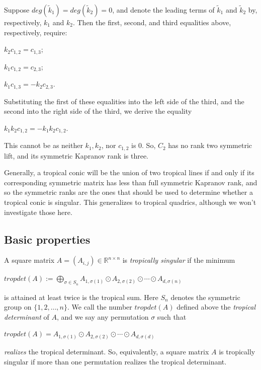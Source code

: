 \documentclass{article}
\begin{document}
Suppose $deg(\tilde{k}_{1}) = deg(\tilde{k}_{2}) = 0$, and denote the leading terms of $\tilde{k}_{1}$ and $\tilde{k}_{2}$ by, respectively, $k_{1}$ and $k_{2}$. Then the first, second, and third equalities above, respectively, require:
\begin{center}
  $k_{2}c_{1,2} = c_{1,3}$;

  $k_{1}c_{1,2} = c_{2,3}$;

  $k_{1}c_{1,3} = -k_{2}c_{2,3}$.
\end{center}
Substituting the first of these equalities into the left side of the third, and the second into the right side of the third, we derive the equality
\begin{center}
  $k_{1}k_{2}c_{1,2} = -k_{1}k_{2}c_{1,2}$.
\end{center}
This cannot be as neither $k_{1},k_{2}$, nor $c_{1,2}$ is $0$. So, $C_{2}$ has no rank two symmetric lift, and its symmetric Kapranov rank is three.

Generally, a tropical conic will be the union of two tropical lines if and only if its corresponding symmetric matrix has less than full symmetric Kapranov rank, and so the symmetric ranks are the ones that should be used to determine whether a tropical conic is singular. This generalizes to tropical quadrics, although we won't investigate those here.

\subsection{Basic properties}

A square matrix $A = (A_{i,j}) \in \mathbb{R}^{n \times n}$ is \emph{tropically singular} if the minimum
  \begin{center}
    $tropdet(A) := \bigoplus_{\sigma \in S_{n}} A_{1,\sigma(1)} \odot A_{2,\sigma(2)} \odot \cdots \odot A_{d,\sigma(n)}$
  \end{center}
  is attained at least twice is the tropical sum. Here $S_{n}$ denotes the symmetric group on $\{1,2,\ldots,n\}$. We call the number $tropdet(A)$ defined above the \emph{tropical determinant} of $A$, and we say any permutation $\sigma$ such that
  \begin{center}
    $tropdet(A) = A_{1,\sigma(1)} \odot A_{2,\sigma(2)} \odot \cdots \odot A_{d,\sigma(d)}$
  \end{center}
  \emph{realizes} the tropical determinant. So, equivalently, a square matrix $A$ is tropically singular if more than one permutation realizes the tropical determinant.
\end{document}
